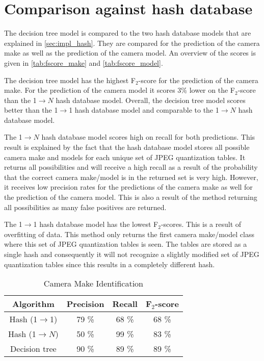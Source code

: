 
\section{Comparison against hash database}
The decision tree model is compared to the two hash database models that are explained in \autoref{sec:impl_hash}. They are compared for the prediction of the camera make as well as the prediction of the camera model. An overview of the scores is given in \autoref{tab:fscore_make} and \autoref{tab:fscore_model}.

The decision tree model has the highest F$_2$-score for the prediction of the camera make. For the prediction of the camera model it scores 3\% lower on the F$_2$-score than the 1$\rightarrow N$ hash database model. Overall, the decision tree model scores better than the 1$\rightarrow$1 hash database model and comparable to the 1$\rightarrow N$ hash database model.

The 1$\rightarrow N$ hash database model scores high on recall for both predictions. This result is explained by the fact that the hash database model stores all possible camera make and models for each unique set of JPEG quantization tables. It returns all possibilities and will receive a high recall as a result of the probability that the correct camera make/model is in the returned set is very high. However, it receives low precision rates for the predictions of the camera make as well for the prediction of the camera model. This is also a result of the method returning all possibilities as many false positives are returned.

The 1$\rightarrow$1 hash database model has the lowest F$_2$-scores. This is a result of overfitting of data. This method only returns the first camera make/model class where this set of JPEG quantization tables is seen. The tables are stored as a single hash and consequently it will not recognize a slightly modified set of JPEG quantization tables since this results in a completely different hash.

\begin{table}[h]
\begin{center}

\begin{tabular}{| c| c| c| c|}
\hline
Algorithm & Precision & Recall & F$_2$-score\\
\hline
Hash (1$\rightarrow$1) & 79 \% & 68 \% & 68 \%\\
Hash (1$\rightarrow N$) & 50 \% & 99 \% & 83 \%\\
Decision tree & 90 \% & 89 \% & 89 \% \\
\hline
\end{tabular}
\caption{Camera Make Identification}
\label{tab:fscore_make}
\end{center}

\end{table}

